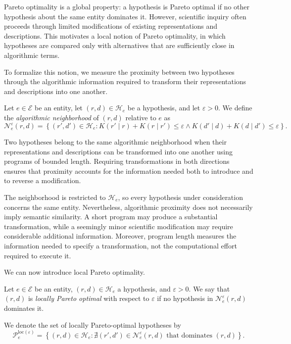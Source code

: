 Pareto optimality is a global property: a hypothesis is Pareto optimal if no other hypothesis about the same entity dominates it. However, scientific inquiry often proceeds through limited modifications of existing representations and descriptions. This motivates a local notion of Pareto optimality, in which hypotheses are compared only with alternatives that are sufficiently close in algorithmic terms.

To formalize this notion, we measure the proximity between two hypotheses through the algorithmic information required to transform their representations and descriptions into one another.

\begin{definition}
Let $e\in\mathcal E$ be an entity, let $(r,d)\in\mathcal H_e$ be a hypothesis, and let $\varepsilon>0$. We define the \emph{algorithmic neighborhood}  of $(r,d)$ relative to $e$ as
\[
\mathcal N^\varepsilon_e(r,d) = \left\{ (r',d') \in\mathcal H_e : 
K(r'\mid r)+K(r\mid r')\leq\varepsilon \land K(d'\mid d)+K(d\mid d')\leq\varepsilon \right\}.
\]
\end{definition}

Two hypotheses belong to the same algorithmic neighborhood when their representations and descriptions can be transformed into one another using programs of bounded length. Requiring transformations in both directions ensures that proximity accounts for the information needed both to introduce and to reverse a modification.

The neighborhood is restricted to $\mathcal H_e$, so every hypothesis under consideration concerns the same entity. Nevertheless, algorithmic proximity does not necessarily imply semantic similarity. A short program may produce a substantial transformation, while a seemingly minor scientific modification may require considerable additional information. Moreover, program length measures the information needed to specify a transformation, not the computational effort required to execute it.

We can now introduce local Pareto optimality.

\begin{definition}
Let $e\in\mathcal E$ be an entity, $(r,d)\in\mathcal H_e$ a hypothesis, and $\varepsilon>0$. We say that $(r,d)$ is \emph{locally Pareto optimal}  with respect to $\varepsilon$ if no hypothesis in $\mathcal N^\varepsilon_e(r,d)$ dominates it.

We denote the set of locally Pareto-optimal hypotheses by
\[
\mathcal P^{\mathrm{loc}(\varepsilon)}_e = \left\{(r,d)\in\mathcal H_e:
\nexists(r',d')\in\mathcal N^\varepsilon_e(r,d) \text{ that dominates }(r,d) \right\}.
\]
\end{definition}

